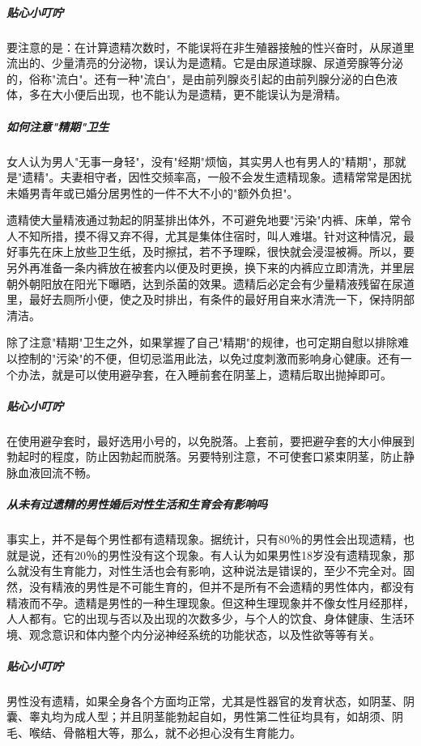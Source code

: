 \begin{enumerate}
\subparagraph{贴心小叮咛}

要注意的是：在计算遗精次数时，不能误将在非生殖器接触的性兴奋时，从尿道里流出的、少量清亮的分泌物，误认为是遗精。它是由尿道球腺、尿道旁腺等分泌的，俗称"流白"。还有一种"流白"，是由前列腺炎引起的由前列腺分泌的白色液体，多在大小便后出现，也不能认为是遗精，更不能误认为是滑精。

\subparagraph{如何注意"精期"卫生}

女人认为男人"无事一身轻"，没有"经期"烦恼，其实男人也有男人的"精期"，那就是"遗精"。夫妻相守者，因性交频率高，一般不会发生遗精现象。遗精常常是困扰未婚男青年或已婚分居男性的一件不大不小的"额外负担"。

遗精使大量精液通过勃起的阴茎排出体外，不可避免地要"污染"内裤、床单，常令人不知所措，摸不得又弃不得，尤其是集体住宿时，叫人难堪。针对这种情况，最好事先在床上放些卫生纸，及时擦拭，若不予理睬，很快就会浸湿被褥。所以，要另外再准备一条内裤放在被套内以便及时更换，换下来的内裤应立即清洗，并里层朝外朝阳放在阳光下曝晒，达到杀菌的效果。遗精后必定会有少量精液残留在尿道里，最好去厕所小便，使之及时排出，有条件的最好用自来水清洗一下，保持阴部清洁。

除了注意"精期"卫生之外，如果掌握了自己"精期"的规律，也可定期自慰以排除难以控制的"污染"的不便，但切忌滥用此法，以免过度刺激而影响身心健康。还有一个办法，就是可以使用避孕套，在入睡前套在阴茎上，遗精后取出抛掉即可。

\subparagraph{贴心小叮咛}

在使用避孕套时，最好选用小号的，以免脱落。上套前，要把避孕套的大小伸展到勃起时的程度，防止因勃起而脱落。另要特别注意，不可使套口紧束阴茎，防止静脉血液回流不畅。

\subparagraph{从未有过遗精的男性婚后对性生活和生育会有影响吗}

事实上，并不是每个男性都有遗精现象。据统计，只有80％的男性会出现遗精，也就是说，还有20％的男性没有这个现象。有人认为如果男性18岁没有遗精现象，那么就没有生育能力，对性生活也会有影响，这种说法是错误的，至少不完全对。固然，没有精液的男性是不可能生育的，但并不是所有不会遗精的男性体内，都没有精液而不孕。遗精是男性的一种生理现象。但这种生理现象并不像女性月经那样，人人都有。它的出现与否以及出现的次数多少，与个人的饮食、身体健康、生活环境、观念意识和体内整个内分泌神经系统的功能状态，以及性欲等等有关。

\subparagraph{贴心小叮咛}

男性没有遗精，如果全身各个方面均正常，尤其是性器官的发育状态，如阴茎、阴囊、睾丸均为成人型；并且阴茎能勃起自如，男性第二性征均具有，如胡须、阴毛、喉结、骨骼粗大等，那么，就不必担心没有生育能力。


\end{enumerate}
